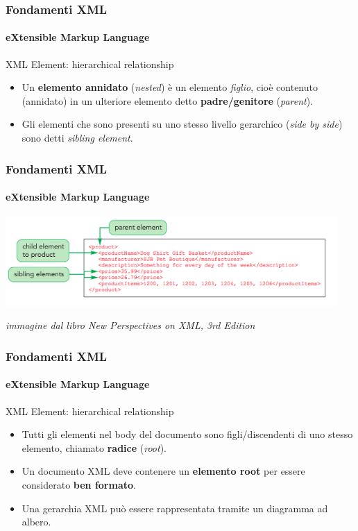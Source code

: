 \begin{frame}
    \frametitle{Fondamenti XML}
    \framesubtitle{eXtensible Markup Language}
    \addtocounter{nframe}{1}

	\begin{block}{XML Element: hierarchical relationship}
		\begin{itemize}
			\item Un \textbf{elemento annidato} (\textit{nested}) è un elemento \textit{figlio}, cioè contenuto (annidato) in un ulteriore elemento detto \textbf{padre/genitore} (\textit{parent}).
			\item Gli elementi che sono presenti su uno stesso livello gerarchico (\textit{side by side}) sono detti \textit{sibling element}.
		\end{itemize}
	\end{block}

\end{frame}

\begin{frame}
	\frametitle{Fondamenti XML}
	\framesubtitle{eXtensible Markup Language}
	\addtocounter{nframe}{1}

	\begin{center}
		\includegraphics[width=0.95\textwidth]{imgs/XML-Parent-Child-Sibling.png}
    \end{center}
\begin{tiny}\textit{immagine dal libro New Perspectives on XML, 3rd Edition}\end{tiny}

\end{frame}

\begin{frame}
    \frametitle{Fondamenti XML}
    \framesubtitle{eXtensible Markup Language}
    \addtocounter{nframe}{1}

	\begin{block}{XML Element: hierarchical relationship}
		\begin{itemize}
			\item Tutti gli elementi nel body del documento sono figli/discendenti di uno stesso elemento, chiamato \textbf{radice} (\textit{root}).
			\item Un documento XML deve contenere un \textbf{elemento root} per essere considerato \textbf{ben formato}.
			\item Una gerarchia XML può essere rappresentata tramite un diagramma ad albero.
		\end{itemize}
	\end{block}

\end{frame}

